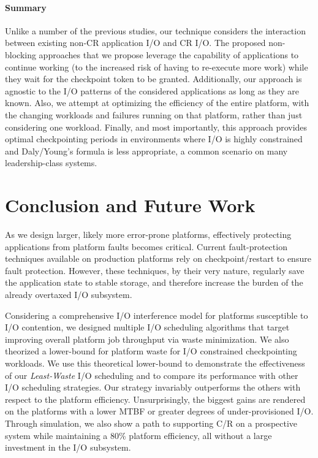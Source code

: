 \documentclass[conference,nofonttune]{IEEEtran}
\newcommand{\leastwaste}{\emph{Least-Waste}\xspace}
\def\cooperative{\leastwaste}
\begin{document}
\paragraph*{Summary}

Unlike a number of the previous studies, our
technique considers the interaction between existing non-CR
application I/O and CR I/O. The proposed non-blocking approaches that
we propose leverage the capability of applications to continue working
(to the increased risk of having to re-execute more work) while they
wait for the checkpoint token to be granted. Additionally, our
approach is agnostic to the I/O patterns of the considered
applications as long as they are known.  Also, we attempt at optimizing
the efficiency of the entire platform, with the changing workloads and
failures running on that platform, rather than just considering one
workload. Finally, and most importantly, this approach provides optimal
checkpointing periods in environments where I/O is highly constrained
and Daly/Young's formula is less appropriate, a common scenario on
many leadership-class systems.


%
\section{Conclusion and Future Work} \label{sec:conclusion}

As we design larger, likely more error-prone platforms, effectively protecting
applications from platform faults becomes critical. Current fault-protection
techniques available on production platforms rely on checkpoint/restart to
ensure fault protection. However, these techniques, by their very nature,
regularly save the application state to stable storage, and therefore increase
the burden of the already overtaxed I/O subsystem.

Considering a comprehensive I/O interference model for platforms susceptible to I/O
contention, we designed multiple I/O scheduling algorithms that target improving
overall platform job throughput via waste minimization. We also theorized a
lower-bound for platform waste for I/O constrained checkpointing workloads. We use
this theoretical lower-bound to demonstrate the effectiveness of our \cooperative
I/O scheduling and to compare its performance with other I/O
scheduling strategies.  Our strategy invariably outperforms the others
with respect to the platform efficiency. Unsurprisingly, the biggest gains are
rendered on the platforms with a lower MTBF or greater degrees of under-provisioned
I/O. Through simulation, we also show a path to supporting C/R on a prospective
system while maintaining a 80\% platform efficiency, all without a large
investment in the I/O subsystem.
\end{document}
